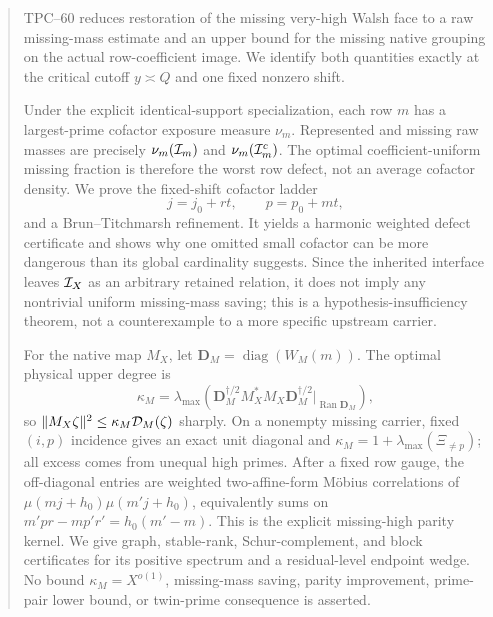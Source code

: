 \begin{abstract}
TPC--60 reduces restoration of the missing very-high Walsh face to a raw
missing-mass estimate and an upper bound for the missing native grouping on
the actual row-coefficient image.  We identify both quantities exactly at
the critical cutoff \(y\asymp Q\) and one fixed nonzero shift.

Under the explicit identical-support specialization, each row \(m\) has a
largest-prime cofactor exposure measure \(\nu_m\).  Represented and missing
raw masses are precisely \(\nu_m(\cI_m)\) and
\(\nu_m(\cI_m^c)\).  The optimal coefficient-uniform missing fraction is
therefore the worst row defect, not an average cofactor density.  We prove
the fixed-shift cofactor ladder
\[
 j=j_0+rt,
 \qquad p=p_0+mt,
\]
and a Brun--Titchmarsh refinement.  It yields a harmonic weighted defect
certificate and shows why one omitted small cofactor can be more dangerous
than its global cardinality suggests.  Since the inherited interface leaves
\(\cI_X\) as an arbitrary retained relation, it does not imply any
nontrivial uniform missing-mass saving; this is a hypothesis-insufficiency
theorem, not a counterexample to a more specific upstream carrier.

For the native map \(M_X\), let
\(\mathbf D_M=\operatorname{diag}(W_M(m))\).  The optimal physical upper degree is
\[
 \kappa_M=
 \lambda_{\max}\!\left(
 \mathbf D_M^{\dagger/2}M_X^*M_X\mathbf D_M^{\dagger/2}
 \big|_{\operatorname{Ran}\mathbf D_M}\right),
\]
so \(\|M_X\zeta\|^2\le\kappa_M\cD_M(\zeta)\) sharply.  On a nonempty
missing carrier, fixed \((i,p)\) incidence gives an exact unit diagonal and
\(\kappa_M=1+\lambda_{\max}(\Xi_{\ne p})\); all excess comes from unequal
high primes.  After a fixed row gauge, the off-diagonal entries are weighted
two-affine-form M\"obius correlations of
\(\mu(mj+h_0)\mu(m'j+h_0)\), equivalently sums on
\(m'pr-mp'r'=h_0(m'-m)\).  This is the explicit missing-high parity
kernel.  We give graph, stable-rank, Schur-complement, and block certificates
for its positive spectrum and a residual-level endpoint wedge.  No bound
\(\kappa_M=X^{o(1)}\), missing-mass saving, parity improvement, prime-pair
lower bound, or twin-prime consequence is asserted.
\end{abstract}

